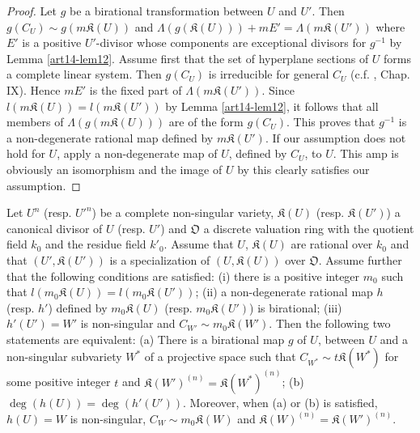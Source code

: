\begin{proof}
Let $g$ be a birational transformation between $U$ and $U'$. Then $g(C_{U})\sim g(m\mathfrak{K}(U))$ and $\Lambda(g(\mathfrak{K}(U)))+mE'=\Lambda(m\mathfrak{K}(U'))$ where $E'$ is a positive $U'$-divisor whose components are exceptional divisors for $g^{-1}$ by Lemma \ref{art14-lem12}. Assume first that the set of hyperplane sections of $U$ forms a complete linear system. Then $g(C_{U})$ is irreducible for general $C_{U}$ (c.f. \cite{art14-key25}, Chap. IX). Hence $mE'$ is the fixed part of $\Lambda(m\mathfrak{K}(U'))$. Since $l(m\mathfrak{K}(U))=l(m\mathfrak{K}(U'))$ by Lemma \ref{art14-lem12}, it follows that all members of $\Lambda(g(m\mathfrak{K}(U)))$ are of the form $g(C_{U})$. This proves that $g^{-1}$ is a non-degenerate rational map defined by $m\mathfrak{K}(U')$. If our assumption does not hold for $U$, apply a non-degenerate map of $U$, defined by $C_{U}$, to $U$. This amp is obviously an isomorphism and the image of $U$ by this clearly satisfies our assumption.
\end{proof}

\begin{lemma}\label{art14-lem14}
Let $U^{n}$ (resp. ${U'}^{n}$) be a complete non-singular variety, $\mathfrak{K}(U)$ (resp. $\mathfrak{K}(U')$) a canonical divisor of $U$ (resp. $U'$) and $\mathfrak{O}$ a discrete valuation ring with the quotient field $k_{0}$ and the residue field $k'_{0}$. Assume that $U$, $\mathfrak{K}(U)$ are rational over $k_{0}$ and that $(U',\mathfrak{K}(U'))$ is a specialization of $(U,\mathfrak{K}(U))$ over $\mathfrak{O}$. Assume further that the following conditions are satisfied: {\rm(i)} there is a positive integer $m_{0}$ such that $l(m_{0}\mathfrak{K}(U))=l(m_{0}\mathfrak{K}(U'))$; {\rm(ii)} a non-degenerate rational map $h$ (resp. $h'$) defined by $m_{0}\mathfrak{K}(U)$ (resp. $m_{0}\mathfrak{K}(U')$) is birational; {\rm(iii)} $h'(U')=W'$ is non-singular and $C_{W'}\sim m_{0}\mathfrak{K}(W')$. Then the following two statements are equivalent: {\rm(a)} There is a birational map $g$ of $U$, between $U$ and a non-singular subvariety $W^{*}$ of a projective space such that $C_{W^{*}}\sim t\mathfrak{K}(W^{*})$ for some positive integer $t$ and $\mathfrak{K}(W')^{(n)}=\mathfrak{K}(W^{*})^{(n)}$; {\rm(b)} $\deg(h(U))=\deg (h'(U'))$. Moreover, when {\rm(a)} or {\rm(b)} is satisfied, $h(U)=W$ is non-singular, $C_{W}\sim m_{0}\mathfrak{K}(W)$ and $\mathfrak{K}(W)^{(n)}=\mathfrak{K}(W')^{(n)}$.
\end{lemma}

